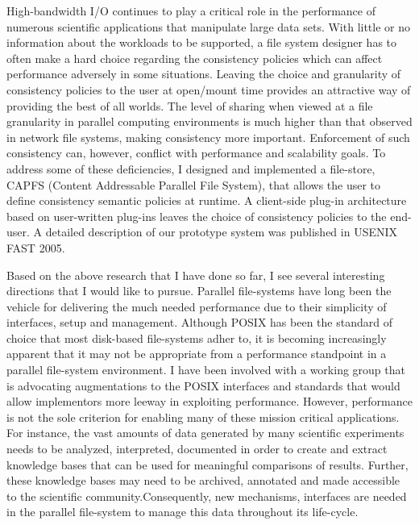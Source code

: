 \documentclass{article}
\begin{document}
High-bandwidth I/O continues to play a critical role
in the performance of numerous scientific applications that manipulate
large data sets.
With little or no information about the
workloads to be supported, a file system designer has to often make
a hard choice regarding the consistency policies which can affect performance
adversely in some situations.
Leaving the choice and granularity 
of consistency policies to the user at open/mount time provides an
attractive way of providing the best of all worlds. The level of sharing when 
viewed at a file granularity in parallel computing
environments is much higher than that observed in network file 
systems, making consistency more important.
Enforcement of such consistency can, however, conflict with performance
and scalability goals. To address some of these deficiencies, I designed and
implemented a file-store, CAPFS (Content
Addressable Parallel File System), that
allows the user to define consistency semantic policies at runtime.
A client-side plug-in architecture based on user-written plug-ins 
leaves the choice of consistency policies to the end-user. A detailed description
of our prototype system was published in USENIX FAST 2005.

Based on the above research that I have done so far, I see several interesting
directions that I would like to pursue. Parallel file-systems have long been the vehicle
for delivering the much needed performance due to their simplicity of interfaces,
setup and management. Although POSIX has been the standard of choice that most
disk-based file-systems adher to, it is becoming increasingly apparent that
it may not be appropriate from a performance standpoint in a parallel file-system environment. 
I have been involved with a working group that is advocating augmentations to the POSIX
interfaces and standards that would allow implementors more leeway in exploiting performance.
However, performance is not the sole criterion for enabling many of these mission critical applications.
For instance, the vast amounts of data generated by many scientific experiments needs to be analyzed, interpreted,
documented in order to create and extract knowledge bases that can be used for meaningful comparisons
of results. Further, these knowledge bases may need to be archived, annotated and made accessible
to the scientific community.Consequently, new mechanisms, interfaces are needed in the parallel
file-system to manage this data throughout its life-cycle. 
\end{document}
